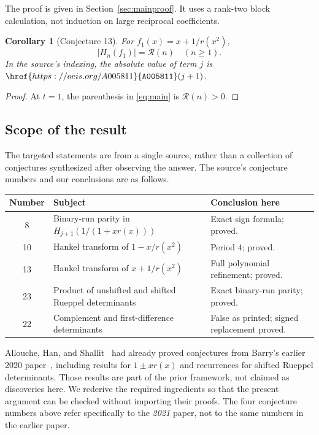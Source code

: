 \documentclass[11pt,a4paper]{article}
\numberwithin{equation}{section}
\newtheorem{corollary}[theorem]{Corollary}
\theoremstyle{definition}
\theoremstyle{remark}
\newcommand{\Runs}{\mathcal R}
\newcommand{\oeis}[1]{\href{https://oeis.org/#1}{\texttt{#1}}}
\begin{document}
The proof is given in Section~\ref{sec:mainproof}. It uses a rank-two
block calculation, not induction on large reciprocal coefficients.

\begin{corollary}[Conjecture 13]\label{cor:c13}
For $f_1(x)=x+1/r(x^2)$,
\begin{equation}\label{eq:c13}
 |H_n(f_1)|=\Runs(n)\quad(n\ge1).
\end{equation}
In the source's indexing, the absolute value of term $j$ is
$\oeis{A005811}(j+1)$.
\end{corollary}
\begin{proof}
At $t=1$, the parenthesis in \eqref{eq:main} is $\Runs(n)>0$.
\end{proof}

\subsection{Scope of the result}

The targeted statements are from a single source, rather than a
collection of conjectures synthesized after observing the answer.
The source's conjecture numbers and our conclusions are as follows.

\begin{center}
\small
\begin{tabular}{@{}c >{\raggedright\arraybackslash}p{} >{\raggedright\arraybackslash}p{}@{}}
\toprule
Number & Subject & Conclusion here\\
\midrule
8 & Binary-run parity in $H_{j+1}(1/(1+xr(x)))$ & Exact sign formula; proved.\\
10 & Hankel transform of $1-x/r(x^2)$ & Period $4$; proved.\\
13 & Hankel transform of $x+1/r(x^2)$ & Full polynomial refinement; proved.\\
23 & Product of unshifted and shifted Rueppel determinants & Exact binary-run parity; proved.\\
22 & Complement and first-difference determinants & False as printed; signed replacement proved.\\
\bottomrule
\end{tabular}
\end{center}

Allouche, Han, and Shallit~\cite{ahs} had already proved conjectures from
Barry's earlier 2020 paper~\cite{barry2020}, including results for
$1\pm xr(x)$ and recurrences for shifted Rueppel determinants. Those
results are part of the prior framework, not claimed as discoveries
here. We rederive the required ingredients so that the present argument
can be checked without importing their proofs. The four conjecture
numbers above refer specifically to the \emph{2021} paper, not to the
same numbers in the earlier paper.
\end{document}
